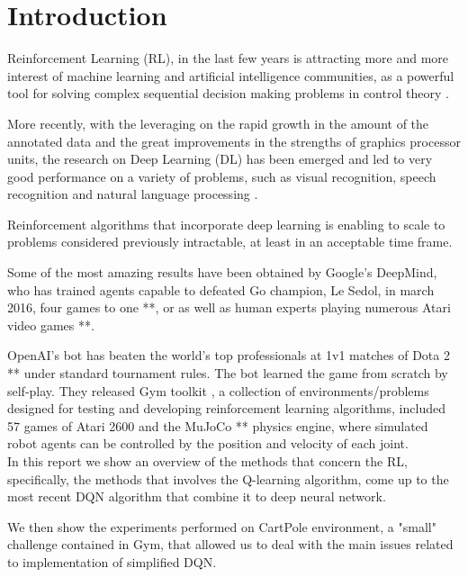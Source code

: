 \section{Introduction}

Reinforcement Learning (RL), in the last few years is attracting more and more interest of machine learning and artificial intelligence communities, as a powerful tool for solving complex sequential decision making problems in control theory \cite{GosaviRLSurvey}.

More recently, with the leveraging on the rapid growth in the amount of the annotated data and the great improvements in the strengths of graphics processor units, the research on  Deep Learning (DL) has been emerged and led to very good performance on a variety of problems, such as visual recognition, speech recognition and natural language processing \cite{AdvancesCNN}.

Reinforcement algorithms that incorporate deep learning is enabling to scale to problems considered previously intractable, at least in an acceptable time frame.

Some of the most amazing results have been obtained by Google’s DeepMind, who has trained agents capable to defeated Go champion, Le Sedol, in march 2016, four games to one **, or as well as human experts playing numerous Atari video games **.

OpenAI's bot has beaten the world's top professionals at 1v1 matches of Dota 2 ** under standard tournament rules. The bot learned the game from scratch by self-play.
They released Gym toolkit \cite{Gym}, a collection of environments/problems designed for testing and developing reinforcement learning algorithms, included 57 games of Atari 2600 and the MuJoCo ** physics engine, where simulated robot agents can be controlled by the position and velocity of each joint. \\


In this report we show an overview of the methods that concern the RL, specifically, the methods that involves the Q-learning algorithm, come up to the most recent DQN algorithm that combine it to deep neural network.

We then show the experiments performed on CartPole environment, a "small" challenge contained in Gym, that allowed us to deal with the main issues related to implementation of simplified DQN.
